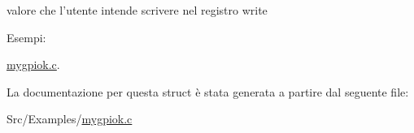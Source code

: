 valore che l'utente intende scrivere nel registro write 

\begin{Desc}
\item[Esempi\+: ]\par
\hyperlink{mygpiok_8c-example}{mygpiok.\+c}.\end{Desc}


La documentazione per questa struct è stata generata a partire dal seguente file\+:\begin{DoxyCompactItemize}
\item 
Src/\+Examples/\hyperlink{mygpiok_8c}{mygpiok.\+c}\end{DoxyCompactItemize}
